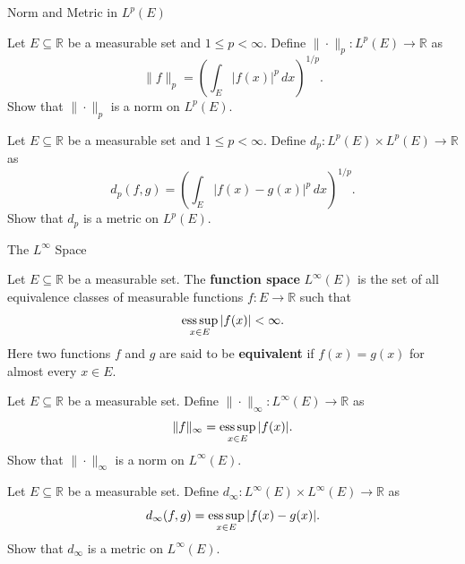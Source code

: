 \documentclass[12pt, a4paper]{article}
\begin{document}
\clearpage

\begin{heading}
    Norm and Metric in $L^p(E)$
\end{heading}

\vspace{10pt}

\begin{theorem}[$L^p$ Norm in $L^p(E)$]
    Let $E\subseteq\mathbb{R}$ be a measurable set and $1\le p<\infty$. Define $\|\cdot\|_p:L^p(E)\to\mathbb{R}$ as
    \[
        \|f\|_p=\left(\int_E |f(x)|^p\,dx\right)^{1/p}.
    \]
    Show that $\|\cdot\|_p$ is a norm on $L^p(E)$.
\end{theorem}

\clearpage

\begin{theorem}[$L^p$ Metric in $L^p(E)$]
    Let $E\subseteq\mathbb{R}$ be a measurable set and $1\le p<\infty$. Define $d_p:L^p(E)\times L^p(E)\to\mathbb{R}$ as
    \[
        d_p(f,g)=\left(\int_E |f(x)-g(x)|^p\,dx\right)^{1/p}.
    \]
    Show that $d_p$ is a metric on $L^p(E)$.
\end{theorem}

\clearpage

\begin{heading}
    The $L^\infty$ Space
\end{heading}

\vspace{10pt}

\begin{definition}[$L^\infty(E)$]
    Let $E\subseteq\mathbb{R}$ be a measurable set. The \textbf{function space} $L^\infty(E)$ is the set of all equivalence classes of measurable functions $f:E\to\mathbb{R}$ such that
    \[
        \operatorname*{ess\,sup}_{x\in E} |f(x)|<\infty.
    \]
    Here two functions $f$ and $g$ are said to be \textbf{equivalent} if $f(x)=g(x)$ for almost every $x\in E$.
\end{definition}

\clearpage

\begin{theorem}
    Let $E\subseteq\mathbb{R}$ be a measurable set. Define $\|\cdot\|_\infty:L^\infty(E)\to\mathbb{R}$ as
    \[
        \|f\|_\infty=\operatorname*{ess\,sup}_{x\in E} |f(x)|.
    \]
    Show that $\|\cdot\|_\infty$ is a norm on $L^\infty(E)$.
\end{theorem}

\clearpage

\begin{theorem}
    Let $E\subseteq\mathbb{R}$ be a measurable set. Define $d_\infty:L^\infty(E)\times L^\infty(E)\to\mathbb{R}$ as
    \[
        d_\infty(f,g)=\operatorname*{ess\,sup}_{x\in E} |f(x)-g(x)|.
    \]
    Show that $d_\infty$ is a metric on $L^\infty(E)$.
\end{theorem}



\clearpage

\EndPage
\end{document}
